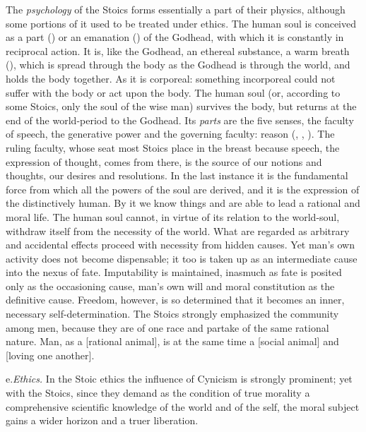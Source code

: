 The \emph{psychology} of the Stoics forms essentially a part of their
physics, although some portions of it used to be treated under ethics.
The human soul is conceived as a part ()
or an emanation () of the Godhead, with which it is
constantly in reciprocal action. It is, like the Godhead, an ethereal
substance, a warm breath (), which is spread through the body
as the Godhead is through the world, and holds the body together. As
 it is corporeal: something incorporeal could not suffer with
the body or act upon the body. The human soul (or, according to some
Stoics, only the soul of the wise man) survives the body, but returns at
the end of the world-period to the Godhead. Its \emph{parts} are the five
senses, the faculty of speech, the generative power and the governing
faculty: reason (, ,
). The ruling faculty, whose seat most Stoics place in
the breast because speech, the expression of thought, comes from there,
is the source of our notions and thoughts, our desires and resolutions.
In the last instance it is the fundamental force from which all the
powers of the soul are derived, and it is the expression of the
distinctively human. By it we know things and are able to lead a
rational and moral life. The human soul cannot, in virtue of its relation
to the world-soul, withdraw itself from the necessity of the world. What
are regarded as arbitrary and accidental effects proceed with necessity
from hidden causes. Yet man's own activity does not become dispensable;
it too is taken up as an intermediate cause into the nexus of fate.
Imputability is maintained, inasmuch as fate is posited only as the
occasioning cause, man's own will and moral constitution as the
definitive cause. Freedom, however, is so determined that it becomes an
inner, necessary self-determination. The Stoics strongly emphasized the
community among men, because they are of one race and partake of the
same rational nature. Man, as a  [rational animal], is
at the same time a  [social animal] and
 [loving one another].

\divrule

e.\enspace \emph{Ethics.} In the Stoic ethics the influence of Cynicism
is strongly prominent; yet with the Stoics, since they demand
as the condition of true morality a comprehensive scientific knowledge of
the world and of the self, the moral subject gains a wider horizon and a
truer liberation.

